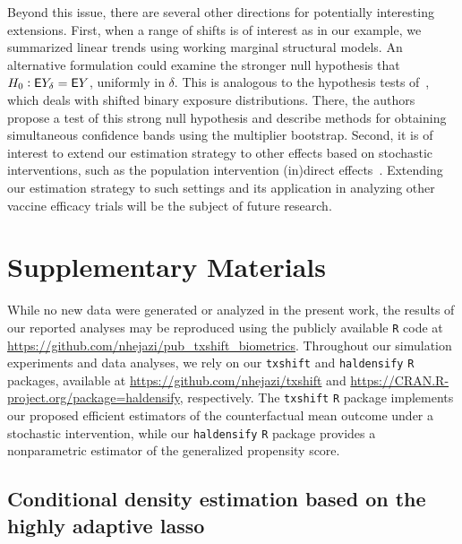 Beyond this issue, there are several other directions for potentially
interesting extensions. First, when a range of shifts is of interest as in our
example, we summarized linear trends using working marginal structural models.
An alternative formulation could examine the stronger null hypothesis that $H_0:
\mathsf{E} Y_{\delta} = \mathsf{E} Y$, uniformly in $\delta$. This is analogous to the
hypothesis tests of~\citet{kennedy2019nonparametric}, which deals with shifted
binary exposure distributions. There, the authors propose a test of this strong
null hypothesis and describe methods for obtaining simultaneous confidence bands
using the multiplier bootstrap. Second, it is of interest to extend our
estimation strategy to other effects based on stochastic interventions, such as
the population intervention (in)direct effects~\citep{diaz2020causal}. Extending
our estimation strategy to such settings and its application in analyzing other
vaccine efficacy trials will be the subject of future research.

\section{Supplementary Materials}\label{sm}

While no new data were generated or analyzed in the present work, the results of
our reported analyses may be reproduced using the publicly available \texttt{R}
code at \url{https://github.com/nhejazi/pub_txshift_biometrics}. Throughout our
simulation experiments and data analyses, we rely on our \texttt{txshift} and
\texttt{haldensify} \texttt{R} packages, available at
\url{https://github.com/nhejazi/txshift} and
\url{https://CRAN.R-project.org/package=haldensify}, respectively. The
\texttt{txshift} \texttt{R} package implements our proposed efficient estimators
of the counterfactual mean outcome under a stochastic intervention, while our
\texttt{haldensify} \texttt{R} package provides a nonparametric estimator of the
generalized propensity score.

\subsection{Conditional density estimation based on the highly adaptive
lasso}\label{cond_dens}

